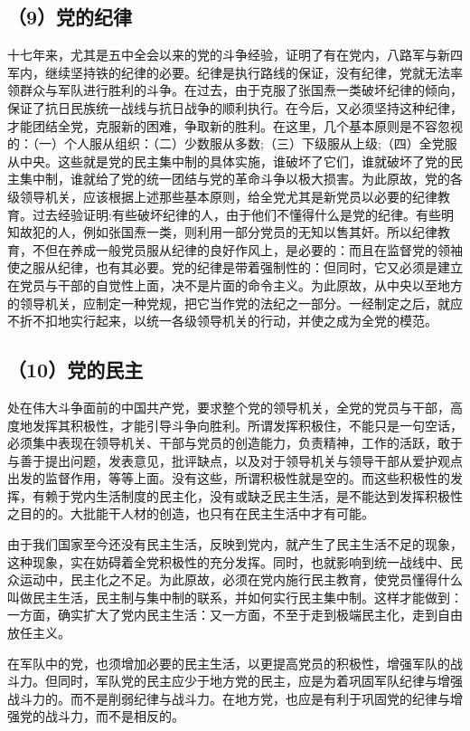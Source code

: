 \subsection{（9）党的纪律}

十七年来，尤其是五中全会以来的党的斗争经验，证明了有在党内，八路军与新四军内，继续坚持铁的纪律的必要。纪律是执行路线的保证，没有纪律，党就无法率领群众与军队进行胜利的斗争。在过去，由于克服了张国焘一类破坏纪律的倾向，保证了抗日民族统一战线与抗日战争的顺利执行。在今后，又必须坚持这种纪律，才能团结全党，克服新的困难，争取新的胜利。在这里，几个基本原则是不容忽视的：（一）个人服从组织：（二）少数服从多数;（三）下级服从上级;（四）全党服从中央。这些就是党的民主集中制的具体实施，谁破坏了它们，谁就破坏了党的民主集中制，谁就给了党的统一团结与党的革命斗争以极大损害。为此原故，党的各级领导机关，应该根据上述那些基本原则，给全党尤其是新党员以必要的纪律教育。过去经验证明:有些破坏纪律的人，由于他们不懂得什么是党的纪律。有些明知故犯的人，例如张国焘一类，则利用一部分党员的无知以售其奸。所以纪律教育，不但在养成一般党员服从纪律的良好作风上，是必要的：而且在监督党的领袖使之服从纪律，也有其必要。党的纪律是带着强制性的：但同时，它又必须是建立在党员与干部的自觉性上面，决不是片面的命令主义。为此原故，从中央以至地方的领导机关，应制定一种党规，把它当作党的法纪之一部分。一经制定之后，就应不折不扣地实行起来，以统一各级领导机关的行动，并使之成为全党的模范。

\subsection{（10）党的民主}

处在伟大斗争面前的中国共产党，要求整个党的领导机关，全党的党员与干部，高度地发挥其积极性，才能引导斗争向胜利。所谓发挥积极住，不能只是一句空话，必须集中表现在领导机关、干部与党员的创造能力，负责精神，工作的活跃，敢于与善于提出问题，发表意见，批评缺点，以及对于领导机关与领导干部从爱护观点出发的监督作用，等等上面。没有这些，所谓积极性就是空的。而这些积极性的发挥，有赖于党内生活制度的民主化，没有或缺乏民主生活，是不能达到发挥积极性之目的的。大批能干人材的创造，也只有在民主生活中才有可能。

由于我们国家至今还没有民主生活，反映到党内，就产生了民主生活不足的现象，这种现象，实在妨碍着全党积极性的充分发挥。同时，也就影响到统一战线中、民众运动中，民主化之不足。为此原故，必须在党内施行民主教育，使党员懂得什么叫做民主生活，民主制与集中制的联系，并如何实行民主集中制。这样才能做到：一方面，确实扩大了党内民主生活：又一方面，不至于走到极端民主化，走到自由放任主义。

在军队中的党，也须增加必要的民主生活，以更提高党员的积极性，增强军队的战斗力。但同时，军队党的民主应少于地方党的民主，应是为着巩固军队纪律与增强战斗力的。而不是削弱纪律与战斗力。在地方党，也应是有利于巩固党的纪律与增强党的战斗力，而不是相反的。

